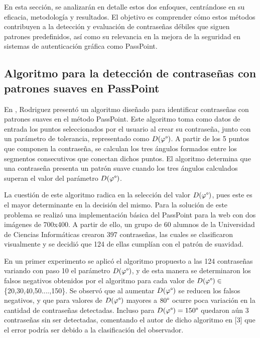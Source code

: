 \documentclass[12pt]{report}
\begin{document}
	En esta sección, se analizarán en detalle estos dos enfoques, centrándose en su eficacia, metodología y resultados. El objetivo es comprender cómo estos métodos contribuyen a la detección y evaluación de contraseñas débiles que siguen patrones predefinidos, así como su relevancia en la mejora de la seguridad en sistemas de autenticación gráfica como PassPoint.

\subsection{Algoritmo para la detección de contraseñas con patrones suaves en PassPoint}

En \cite{3}, Rodriguez presentó un algoritmo diseñado para identificar contraseñas con patrones suaves en el método PassPoint. Este algoritmo toma como datos de entrada los puntos seleccionados por el usuario al crear su contraseña, junto con un parámetro de tolerancia, representado como $D(\varphi\degree)$. A partir de los 5 puntos que componen la contraseña, se calculan los tres ángulos formados entre los segmentos consecutivos que conectan dichos puntos. El algoritmo determina que una contraseña presenta un patrón suave cuando los tres ángulos calculados superan el valor del parámetro $D(\varphi\degree)$.

La cuestión de este algoritmo radica en la selección del valor $D(\varphi\degree)$, pues este es el mayor determinante en la decisión del mismo. Para la solución de este problema se realizó una implementación básica del PassPoint para la web con dos imágenes de 700x400. A partir de ello, un grupo de 60 alumnos de la Universidad de Ciencias Informáticas crearon 397 contraseñas, las cuales se clasificaron visualmente y se decidió que 124 de ellas cumplían con el patrón de suavidad. 

En un primer experimento se aplicó el algoritmo propuesto a las 124 contraseñas variando con paso 10 el parámetro $D(\varphi\degree)$, y de esta manera se determinaron los falsos negativos obtenidos por el algoritmo para cada valor de $D(\varphi\degree)\in$ \{20,30,40,50....,150\}. Se observó que al aumentar $D(\varphi\degree)$ se reducen los falsos negativos, y que para valores de $D(\varphi\degree)$ mayores a $80\degree$  ocurre poca variación en la cantidad de contraseñas detectadas. Incluso para $D(\varphi\degree)=150\degree$ quedaron aún 3 contraseñas sin ser detectadas, comentando el autor de dicho algoritmo en [3] que el error podría ser debido a la clasificación del observador.  
\end{document}
